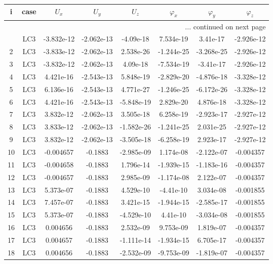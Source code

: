 \documentclass{article}%
\begin{document}
\begin{longtable}{| c c | c c c c c c |}%
\hline%
i&case&$U_x$&$U_y$&$U_z$&$\varphi_x$&$\varphi_y$&$\varphi_z$\\%
\hline%
\endhead%
\hline%
\multicolumn{8}{r}{... continued on next page}\\%
\endfoot%
\hline%
\endlastfoot%
1&LC3&{-}3.832e{-}12&{-}2.062e{-}13&{-}4.09e{-}18&7.534e{-}19&3.41e{-}17&{-}2.926e{-}12\\%
2&LC3&{-}3.833e{-}12&{-}2.062e{-}13&2.538e{-}26&{-}1.244e{-}25&{-}3.268e{-}25&{-}2.926e{-}12\\%
3&LC3&{-}3.832e{-}12&{-}2.062e{-}13&4.09e{-}18&{-}7.534e{-}19&{-}3.41e{-}17&{-}2.926e{-}12\\%
4&LC3&4.421e{-}16&{-}2.543e{-}13&5.848e{-}19&{-}2.829e{-}20&{-}4.876e{-}18&{-}3.328e{-}12\\%
5&LC3&6.136e{-}16&{-}2.543e{-}13&4.771e{-}27&{-}1.246e{-}25&{-}6.172e{-}26&{-}3.328e{-}12\\%
6&LC3&4.421e{-}16&{-}2.543e{-}13&{-}5.848e{-}19&2.829e{-}20&4.876e{-}18&{-}3.328e{-}12\\%
7&LC3&3.832e{-}12&{-}2.062e{-}13&3.505e{-}18&6.258e{-}19&{-}2.923e{-}17&{-}2.927e{-}12\\%
8&LC3&3.833e{-}12&{-}2.062e{-}13&{-}1.582e{-}26&{-}1.241e{-}25&2.031e{-}25&{-}2.927e{-}12\\%
9&LC3&3.832e{-}12&{-}2.062e{-}13&{-}3.505e{-}18&{-}6.258e{-}19&2.923e{-}17&{-}2.927e{-}12\\%
10&LC3&{-}0.004657&{-}0.1883&{-}2.985e{-}09&1.174e{-}08&{-}2.122e{-}07&{-}0.004357\\%
11&LC3&{-}0.004658&{-}0.1883&1.796e{-}14&{-}1.939e{-}15&{-}1.183e{-}16&{-}0.004357\\%
12&LC3&{-}0.004657&{-}0.1883&2.985e{-}09&{-}1.174e{-}08&2.122e{-}07&{-}0.004357\\%
13&LC3&5.373e{-}07&{-}0.1883&4.529e{-}10&{-}4.41e{-}10&3.034e{-}08&{-}0.001855\\%
14&LC3&7.457e{-}07&{-}0.1883&3.421e{-}15&{-}1.944e{-}15&{-}2.585e{-}17&{-}0.001855\\%
15&LC3&5.373e{-}07&{-}0.1883&{-}4.529e{-}10&4.41e{-}10&{-}3.034e{-}08&{-}0.001855\\%
16&LC3&0.004656&{-}0.1883&2.532e{-}09&9.753e{-}09&1.819e{-}07&{-}0.004357\\%
17&LC3&0.004657&{-}0.1883&{-}1.111e{-}14&{-}1.934e{-}15&6.705e{-}17&{-}0.004357\\%
18&LC3&0.004656&{-}0.1883&{-}2.532e{-}09&{-}9.753e{-}09&{-}1.819e{-}07&{-}0.004357\\%

\end{longtable}
\end{document}
